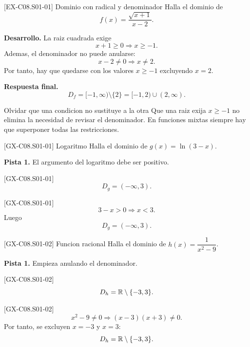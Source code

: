 \begin{solvedexample}{[EX-C08.S01-01] Dominio con radical y denominador}
Halla el dominio de
\[
f(x)=\frac{\sqrt{x+1}}{x-2}.
\]

\textbf{Desarrollo.} La raiz cuadrada exige
\[
x+1\geq 0 \Longrightarrow x\geq -1.
\]
Ademas, el denominador no puede anularse:
\[
x-2\neq 0 \Longrightarrow x\neq 2.
\]
Por tanto, hay que quedarse con los valores \(x\geq -1\) excluyendo \(x=2\).

\textbf{Respuesta final.}
\[
D_f=[-1,\infty)\setminus\{2\}=[-1,2)\cup(2,\infty).
\]
\end{solvedexample}

\begin{commonerror}{Olvidar que una condicion no sustituye a la otra}
Que una raiz exija \(x\geq -1\) no elimina la necesidad de revisar el denominador. En funciones
mixtas siempre hay que superponer todas las restricciones.
\end{commonerror}

\begin{guidedexercise}{[GX-C08.S01-01] Logaritmo}
Halla el dominio de \(g(x)=\ln(3-x)\).

\textbf{Pista 1.} El argumento del logaritmo debe ser positivo.
\end{guidedexercise}

\begin{shortanswer}{[GX-C08.S01-01]}
\[
D_g=(-\infty,3).
\]
\end{shortanswer}

\begin{fullsolution}{[GX-C08.S01-01]}
\[
3-x>0 \Longrightarrow x<3.
\]
Luego
\[
D_g=(-\infty,3).
\]
\end{fullsolution}

\begin{guidedexercise}{[GX-C08.S01-02] Funcion racional}
Halla el dominio de \(h(x)=\dfrac{1}{x^2-9}\).

\textbf{Pista 1.} Empieza anulando el denominador.
\end{guidedexercise}

\begin{shortanswer}{[GX-C08.S01-02]}
\[
D_h=\mathbb{R}\setminus\{-3,3\}.
\]
\end{shortanswer}

\begin{fullsolution}{[GX-C08.S01-02]}
\[
x^2-9\neq 0 \Longrightarrow (x-3)(x+3)\neq 0.
\]
Por tanto, se excluyen \(x=-3\) y \(x=3\):
\[
D_h=\mathbb{R}\setminus\{-3,3\}.
\]
\end{fullsolution}

